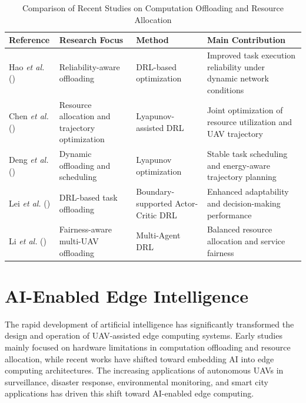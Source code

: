 \documentclass[a4paper, 12pt]{article}
\begin{document}
\begin{table}[H]
\centering
\caption{Comparison of Recent Studies on Computation Offloading and Resource Allocation}
\label{tab:offloading_comparison}
\begin{tabular}{|p{2.5cm}|p{2.8cm}|p{3cm}|p{5cm}|}
\hline
\textbf{Reference} & \textbf{Research Focus} & \textbf{Method} & \textbf{Main Contribution} \\
\hline
Hao \textit{et al.} (\cite{Hao2025})
&
Reliability-aware offloading
&
DRL-based optimization
&
Improved task execution reliability under dynamic network conditions
\\
\hline

Chen \textit{et al.} (\cite{Chen2025TSC})
&
Resource allocation and trajectory optimization
&
Lyapunov-assisted DRL
&
Joint optimization of resource utilization and UAV trajectory
\\
\hline

Deng \textit{et al.} (\cite{Deng2025})
&
Dynamic offloading and scheduling
&
Lyapunov optimization
&
Stable task scheduling and energy-aware trajectory planning
\\
\hline

Lei \textit{et al.} (\cite{Lei2025})
&
DRL-based task offloading
&
Boundary-supported Actor-Critic DRL
&
Enhanced adaptability and decision-making performance
\\
\hline

Li \textit{et al.} (\cite{Li2025DRCN})
&
Fairness-aware multi-UAV offloading
&
Multi-Agent DRL
&
Balanced resource allocation and service fairness
\\
\hline

\end{tabular}
\end{table}


\section*{AI-Enabled Edge Intelligence}
The rapid development of artificial intelligence has significantly transformed the design and operation of UAV-assisted edge computing systems. Early studies mainly focused on hardware limitations in computation offloading and resource allocation, while recent works have shifted toward embedding AI into edge computing architectures. The increasing applications of autonomous UAVs in surveillance, disaster response, environmental monitoring, and smart city applications has driven this shift toward AI-enabled edge computing.
\end{document}
